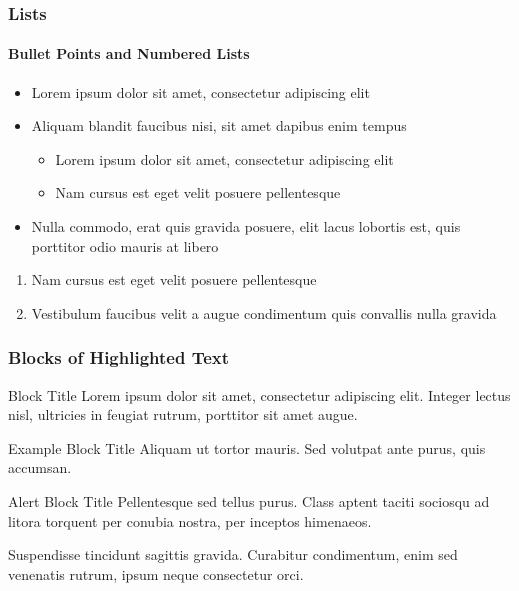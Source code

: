 \documentclass[
	11pt, %
]{beamer}
\begin{document}
\begin{frame}
    \frametitle{Lists}
    \framesubtitle{Bullet Points and Numbered Lists} %

    \begin{itemize}
        \item Lorem ipsum dolor sit amet, consectetur adipiscing elit
        \item Aliquam blandit faucibus nisi, sit amet dapibus enim tempus
              \begin{itemize}
                  \item Lorem ipsum dolor sit amet, consectetur adipiscing elit
                  \item Nam cursus est eget velit posuere pellentesque
              \end{itemize}
        \item Nulla commodo, erat quis gravida posuere, elit lacus lobortis est, quis porttitor odio mauris at libero
    \end{itemize}

    \bigskip %

    \begin{enumerate}
        \item Nam cursus est eget velit posuere pellentesque
        \item Vestibulum faucibus velit a augue condimentum quis convallis nulla gravida
    \end{enumerate}
\end{frame}



\begin{frame}
    \frametitle{Blocks of Highlighted Text}

    \begin{block}{Block Title}
        Lorem ipsum dolor sit amet, consectetur adipiscing elit. Integer lectus nisl, ultricies in feugiat rutrum, porttitor sit amet augue.
    \end{block}

    \begin{exampleblock}{Example Block Title}
        Aliquam ut tortor mauris. Sed volutpat ante purus, quis accumsan.
    \end{exampleblock}

    \begin{alertblock}{Alert Block Title}
        Pellentesque sed tellus purus. Class aptent taciti sociosqu ad litora torquent per conubia nostra, per inceptos himenaeos.
    \end{alertblock}

    \begin{block}{} %
        Suspendisse tincidunt sagittis gravida. Curabitur condimentum, enim sed venenatis rutrum, ipsum neque consectetur orci.
    \end{block}
\end{frame}
\end{document}
